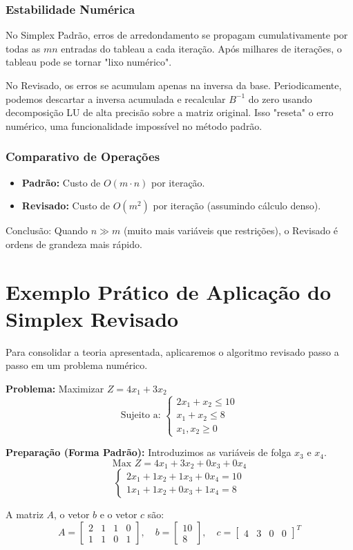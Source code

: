 \documentclass[12pt, a4paper]{article}
\begin{document}
\subsubsection{Estabilidade Numérica}
No Simplex Padrão, erros de arredondamento se propagam cumulativamente por todas as $mn$ entradas do tableau a cada iteração. Após milhares de iterações, o tableau pode se tornar "lixo numérico".

No Revisado, os erros se acumulam apenas na inversa da base. Periodicamente, podemos descartar a inversa acumulada e recalcular $B^{-1}$ do zero usando decomposição LU de alta precisão sobre a matriz original. Isso "reseta" o erro numérico, uma funcionalidade impossível no método padrão.

\subsubsection{Comparativo de Operações}
\begin{itemize}
    \item \textbf{Padrão:} Custo de $O(m \cdot n)$ por iteração.
    \item \textbf{Revisado:} Custo de $O(m^2)$ por iteração (assumindo cálculo denso).
\end{itemize}
Conclusão: Quando $n \gg m$ (muito mais variáveis que restrições), o Revisado é ordens de grandeza mais rápido.

\section{Exemplo Prático de Aplicação do Simplex Revisado}
Para consolidar a teoria apresentada, aplicaremos o algoritmo revisado passo a passo em um problema numérico.

\textbf{Problema:} Maximizar $Z = 4x_1 + 3x_2$
$$ \text{Sujeito a: } \begin{cases} 2x_1 + x_2 \le 10 \\ x_1 + x_2 \le 8 \\ x_1, x_2 \ge 0 \end{cases} $$

\textbf{Preparação (Forma Padrão):}
Introduzimos as variáveis de folga $x_3$ e $x_4$.
$$ \text{Max } Z = 4x_1 + 3x_2 + 0x_3 + 0x_4 $$
$$ \begin{cases} 2x_1 + 1x_2 + 1x_3 + 0x_4 = 10 \\ 1x_1 + 1x_2 + 0x_3 + 1x_4 = 8 \end{cases} $$

A matriz $A$, o vetor $b$ e o vetor $c$ são:
$$ A = \begin{bmatrix} 2 & 1 & 1 & 0 \\ 1 & 1 & 0 & 1 \end{bmatrix}, \quad b = \begin{bmatrix} 10 \\ 8 \end{bmatrix}, \quad c = \begin{bmatrix} 4 & 3 & 0 & 0 \end{bmatrix}^T $$
\end{document}
